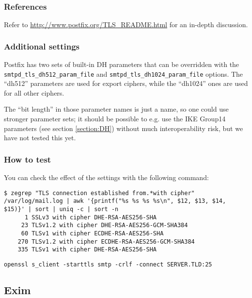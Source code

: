 \subsubsection{References}
Refer to \url{http://www.postfix.org/TLS_README.html} for an in-depth
discussion.

\subsubsection{Additional settings}
Postfix has two sets of built-in DH parameters that can be overridden
with the \verb|smtpd_tls_dh512_param_file|
and \verb|smtpd_tls_dh1024_param_file| options. The ``dh512''
parameters are used for export ciphers, while the ``dh1024'' ones are
used for all other ciphers.

The ``bit length'' in those parameter names is just a name, so one
could use stronger parameter sets; it should be possible to e.g. use the
IKE Group14 parameters (see section \ref{section:DH}) without much
interoperability risk, but we have not tested this yet.



\subsubsection{How to test}
You can check the effect of the settings with the following command:
\begin{lstlisting}
$ zegrep "TLS connection established from.*with cipher" /var/log/mail.log | awk '{printf("%s %s %s %s\n", $12, $13, $14, $15)}' | sort | uniq -c | sort -n
      1 SSLv3 with cipher DHE-RSA-AES256-SHA
     23 TLSv1.2 with cipher DHE-RSA-AES256-GCM-SHA384
     60 TLSv1 with cipher ECDHE-RSA-AES256-SHA
    270 TLSv1.2 with cipher ECDHE-RSA-AES256-GCM-SHA384
    335 TLSv1 with cipher DHE-RSA-AES256-SHA
\end{lstlisting}

\begin{lstlisting}
openssl s_client -starttls smtp -crlf -connect SERVER.TLD:25
\end{lstlisting}


\subsection{Exim}

